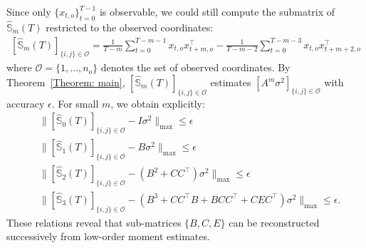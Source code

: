 \documentclass[11pt]{article}
\begin{document}
Since only $\{x_{t,o}\}_{t=0}^{T-1}$ is observable, we could still compute the submatrix of $\hat{\mathbb{S}}_m(T)$ restricted to the observed coordinates:
\begin{align}
    \label{eq:estimator (partial obs)}
    [\hat{\mathbb{S}}_m(T)]_{\{i,j\}\in \mathcal{O}} = \frac{1}{T-m}\sum_{t=0}^{T-m-1}{x}_{t,o}{x}_{t+m,o}^\top - \frac{1}{T-m-2}\sum_{t=0}^{T-m-3}{x}_{t,o}{x}_{t+m+2,o}^\top
\end{align}
where $\mathcal{O}=\{1,\dots,n_o\}$ denotes the set of observed coordinates. By Theorem~\ref{Theorem: main}, $[\hat{\mathbb{S}}_m(T)]_{\{i,j\}\in \mathcal{O}}$ estimates $[A^m\sigma^2]_{\{i,j\}\in \mathcal{O}}$ with accuracy $\epsilon$. For small $m$, we obtain explicitly:
\begin{align*}
    &\|[\hat{\mathbb{S}}_0(T)]_{\{i,j\}\in \mathcal{O}} - I\sigma^2\|_{\max} \le \epsilon \\
    &\|[\hat{\mathbb{S}}_1(T)]_{\{i,j\}\in \mathcal{O}}- B\sigma^2\|_{\max} \le \epsilon \\
    &\|[\hat{\mathbb{S}}_2(T)]_{\{i,j\}\in \mathcal{O}} - (B^2+CC^\top)\sigma^2\|_{\max} \le \epsilon \\
    &\|[\hat{\mathbb{S}}_3(T)]_{\{i,j\}\in \mathcal{O}} - (B^3+CC^\top B+BCC^\top+CEC^\top)\sigma^2\|_{\max} \le \epsilon. 
\end{align*}
These relations reveal that sub-matrices $\{B, C, E\}$ can be reconstructed successively from low-order moment estimates.
\end{document}
